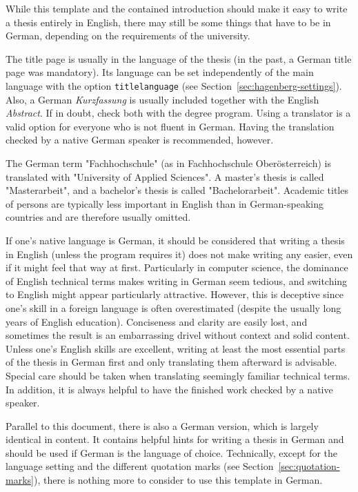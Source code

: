 While this template and the contained introduction should make it easy to write
a thesis entirely in English, there may still be some things that have to be in
German, depending on the requirements of the university.

The title page is usually in the language of the thesis (in the past, a German
title page was mandatory). Its language can be set independently of the main
language with the option \texttt{titlelanguage} (see
Section~\ref{sec:hagenberg-settings}). Also, a German \emph{Kurzfassung} is
usually included together with the English \emph{Abstract}. If in doubt, check
both with the degree program. Using a translator is a valid option for everyone
who is not fluent in German. Having the translation checked by a native German
speaker is recommended, however.

The German term "Fachhochschule" (as in Fachhochschule Oberösterreich) is
translated with "University of Applied Sciences". A master's thesis is called
"Masterarbeit", and a bachelor's thesis is called "Bachelorarbeit". Academic
titles of persons are typically less important in English than in
German-speaking countries and are therefore usually omitted.

If one's native language is German, it should be considered that writing a
thesis in English (unless the program requires it) does not make writing any
easier, even if it might feel that way at first. Particularly in computer
science, the dominance of English technical terms makes writing in German seem
tedious, and switching to English might appear particularly attractive. However,
this is deceptive since one's skill in a foreign language is often overestimated
(despite the usually long years of English education). Conciseness and clarity
are easily lost, and sometimes the result is an embarrassing drivel without
context and solid content. Unless one's English skills are excellent, writing at
least the most essential parts of the thesis in German first and only
translating them afterward is advisable. Special care should be taken when
translating seemingly familiar technical terms. In addition, it is always
helpful to have the finished work checked by a native speaker.

Parallel to this document, there is also a German version, which is largely
identical in content. It contains helpful hints for writing a thesis in German
and should be used if German is the language of choice. Technically, except for
the language setting and the different quotation marks (see
Section~\ref{sec:quotation-marks}), there is nothing more to consider to use
this template in German.


